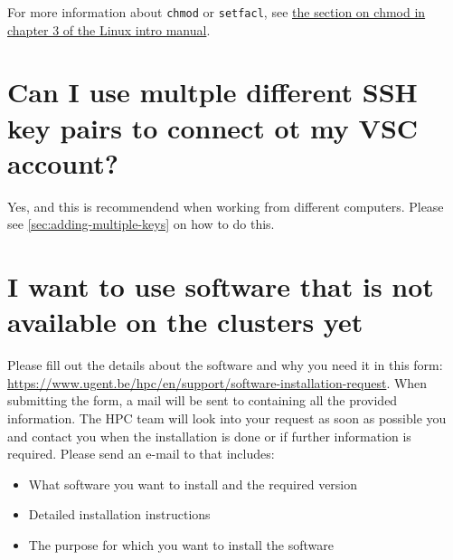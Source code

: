 For more information about \lstinline|chmod| or \lstinline|setfacl|, see \href{\LinuxManualURL#sec:chmod}
{the section on chmod in chapter 3 of the Linux intro manual}.

\section{Can I use multple different SSH key pairs to connect ot my VSC account?}

Yes, and this is recommendend when working from different computers. Please see
\autoref{sec:adding-multiple-keys} on how to do this.

\section{I want to use software that is not available on the clusters yet}

\ifgent
Please fill out the details about the software and why you need it in this form:
\url{https://www.ugent.be/hpc/en/support/software-installation-request}.
When submitting the form, a mail will be sent to \hpcinfo containing all the
provided information. The HPC team will look into your request as soon as possible
you and contact you when the installation is done or if further information is required.
\else
Please send an e-mail to \hpcinfo that includes:
\begin{itemize}
    \item What software you want to install and the required version
    \item Detailed installation instructions
    \item The purpose for which you want to install the software
\end{itemize}
\fi
